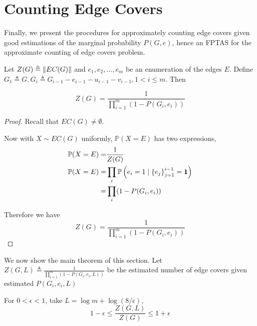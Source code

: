 \section{Counting Edge Covers}

Finally, we present the procedures for approximately counting edge covers given good estimations of the marginal probability $P(G,e)$, hence an FPTAS for the approximate counting of edge covers problem.

\begin{Prop}

	Let $Z(G) \triangleq \left\Vert EC(G)\right\Vert$ and $e_1,e_2,\ldots,e_m$ be an enumeration of the edges $E$. Define $G_1 \triangleq G, G_i \triangleq G_{i-1} - e_{i-1} - u_{i-1} - v_{i-1}, 1 < i \leq m $. Then

	\[ Z(G) = \frac{1}{\prod_{i=1}^m (1 - P(G_i, e_i))} \]

\end{Prop}

\begin{proof}
	Recall that $EC(G) \neq \emptyset$.%

	Now with $X \sim EC(G)$ uniformly, $\mathbb{P}(X=E)$ has two expressions,
	\begin{align*}
		\mathbb{P} (X = E) =& \frac{1}{Z(G)} \\
		\mathbb{P} (X = E) =& \prod_i \mathbb{P} \left(e_i = 1 \mid \left\{e_j\right\}_{j=1}^{i-1} = \mathbf{1} \right) \\
		=&\prod_i (1- P(G_i, e_i))
	\end{align*}

	Therefore we have
	\[ Z(G) = \frac{1}{\prod_{i=1}^m (1 - P(G_i, e_i))} \]
\end{proof}

We now show the main theorem of this section.
Let $Z(G, L) \triangleq \frac{1}{\prod_{i=1}^m (1 - P(G_i, e_i, L))}$ be the estimated number of edge covers given estimated $P(G_i, e_i, L)$

\begin{Thm}
	For $0< \epsilon <1$, take $L=\log m + \log(8/ \epsilon) $,
	\[ 1- \epsilon \leq \frac{Z(G, L)}{Z(G)} \leq 1+ \epsilon\]
\end{Thm}

